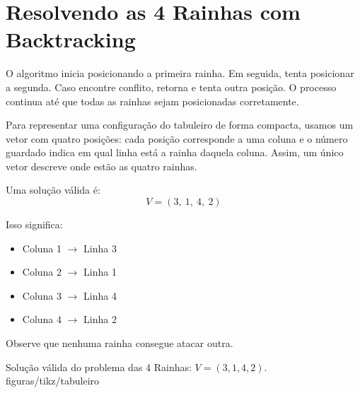 \section{Resolvendo as 4 Rainhas com Backtracking}

O algoritmo inicia posicionando a primeira rainha. Em seguida, tenta posicionar a segunda. Caso encontre conflito, retorna e tenta outra posição. O processo continua até que todas as rainhas sejam posicionadas corretamente.

Para representar uma configuração do tabuleiro de forma compacta, usamos um vetor com quatro posições: cada posição corresponde a uma coluna e o número guardado indica em qual linha está a rainha daquela coluna. Assim, um único vetor descreve onde estão as quatro rainhas.

Uma solução válida é:
\[
  V = (3,\ 1,\ 4,\ 2)
\]

Isso significa:

\begin{itemize}[leftmargin=1.4em]
  \item Coluna 1 $\rightarrow$ Linha 3
  \item Coluna 2 $\rightarrow$ Linha 1
  \item Coluna 3 $\rightarrow$ Linha 4
  \item Coluna 4 $\rightarrow$ Linha 2
\end{itemize}

Observe que nenhuma rainha consegue atacar outra.

%
  {Solução válida do problema das 4 Rainhas: $V=(3,1,4,2)$.}%
  {figuras/tikz/tabuleiro}
